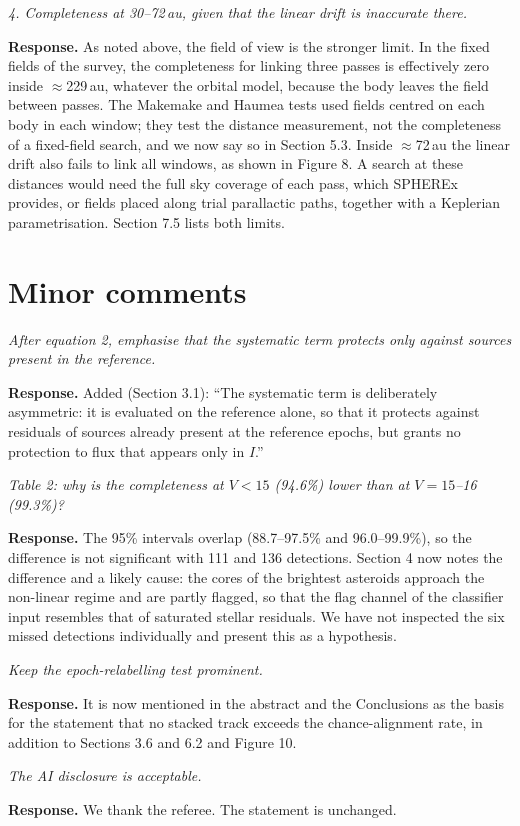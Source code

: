 \documentclass[11pt]{article}
\newenvironment{referee}{\par\color{black!60}\itshape}{\par}
\newcommand{\resp}{\par\noindent\textbf{Response.} }
\begin{document}
\begin{referee}
4. Completeness at 30--72\,au, given that the linear drift is inaccurate there.
\end{referee}
\resp As noted above, the field of view is the stronger limit. In the fixed fields of the survey, the completeness for linking three passes is effectively zero inside $\approx$229\,au, whatever the orbital model, because the body leaves the field between passes. The Makemake and Haumea tests used fields centred on each body in each window; they test the distance measurement, not the completeness of a fixed-field search, and we now say so in Section 5.3. Inside $\approx$72\,au the linear drift also fails to link all windows, as shown in Figure 8. A search at these distances would need the full sky coverage of each pass, which SPHEREx provides, or fields placed along trial parallactic paths, together with a Keplerian parametrisation. Section 7.5 lists both limits.

\section*{Minor comments}

\begin{referee}
After equation 2, emphasise that the systematic term protects only against sources present in the reference.
\end{referee}
\resp Added (Section 3.1): ``The systematic term is deliberately asymmetric: it is evaluated on the reference alone, so that it protects against residuals of sources already present at the reference epochs, but grants no protection to flux that appears only in $I$.''

\begin{referee}
Table 2: why is the completeness at $V < 15$ (94.6\%) lower than at $V = 15$--16 (99.3\%)?
\end{referee}
\resp The 95\% intervals overlap (88.7--97.5\% and 96.0--99.9\%), so the difference is not significant with 111 and 136 detections. Section 4 now notes the difference and a likely cause: the cores of the brightest asteroids approach the non-linear regime and are partly flagged, so that the flag channel of the classifier input resembles that of saturated stellar residuals. We have not inspected the six missed detections individually and present this as a hypothesis.

\begin{referee}
Keep the epoch-relabelling test prominent.
\end{referee}
\resp It is now mentioned in the abstract and the Conclusions as the basis for the statement that no stacked track exceeds the chance-alignment rate, in addition to Sections 3.6 and 6.2 and Figure 10.

\begin{referee}
The AI disclosure is acceptable.
\end{referee}
\resp We thank the referee. The statement is unchanged.
\end{document}
